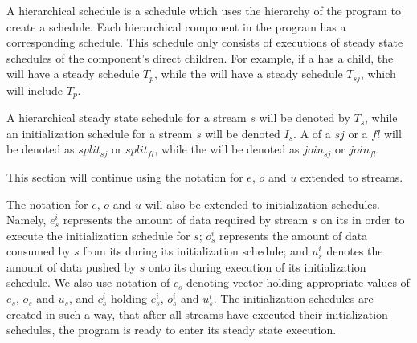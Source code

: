 A hierarchical schedule is a schedule which uses the hierarchy of
the program to create a schedule. Each hierarchical component in
the program has a corresponding schedule. This schedule only
consists of executions of steady state schedules of the
component's direct children. For example, if a {\splitjoin} has a
{\pipeline} child, the {\pipeline} will have a steady schedule $T_p$,
while the {\splitjoin} will have a steady schedule $T_{sj}$, which
will include $T_p$.

A hierarchical steady state schedule for a stream $s$ will be
denoted by $T_s$, while an initialization schedule for a stream
$s$ will be denoted $I_s$. A {\splitter} of a {\splitjoin} $sj$ or
a {{\feedbackloop}} $fl$ will be denoted as $split_{sj}$ or
$split_{fl}$, while the {\joiner} will be denoted as $join_{sj}$
or $join_{fl}$.

This section will continue using the notation for $e$, $o$ and $u$
extended to streams.
\begin{comment}
That is, for a stream $s$,
$e_s$ will represent the amount of data needed by $s$ on its
{\Input} {{\Channel}} in order to execute its minimal steady state
schedule; $o_s$ represents the amount of data consumed by from its
{\Input} {{\Channel}} $s$ during execution of its steady state
schedule; and $u_s$ represents the amount of data pushed by $s$
onto its {\Output} {{\Channel}}.
\end{comment}
The notation for $e$, $o$ and $u$ will also be extended to
initialization schedules.  Namely, $e^i_s$ represents the amount
of data required by stream $s$ on its {\Input} {{\Channel}} in
order to execute the initialization schedule for $s$; $o^i_s$
represents the amount of data consumed by $s$ from its {\Input}
{{\Channel}} during its initialization schedule; and $u^i_s$
denotes the amount of data pushed by $s$ onto its {\Output}
{{\Channel}} during execution of its initialization schedule. We
also use notation of $c_s$ denoting vector holding appropriate
values of $e_s$, $o_s$ and $u_s$, and $c^i_s$ holding $e^i_s$,
$o^i_s$ and $u^i_s$. The initialization schedules are created in
such a way, that after all streams have executed their
initialization schedules, the program is ready to enter its steady
state execution.

\begin{comment}
Note, that it is possible that a stream $s$ has $u^i_s \ne
0$. An example of this will be presented in Section
\ref{sec:sas-fl}.
\end{comment}

